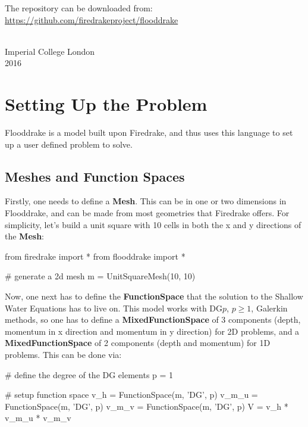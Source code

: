 \documentclass[10pt,letterpaper,extrafontsizes]{memoir}
\newcommand\svnidlong[4]{}
\newcommand\pythonclass[1]{\textbf{\color{deepred}#1}}
\begin{document}
    The repository can be downloaded from: \\
    \url{https://github.com/firedrakeproject/flooddrake}
    
{ \\ Imperial College London \\ 2016\par}


\svnidlong
{$Ignore: $}
{$LastChangedDate: 2015-04-22 17:17:51 +0200 (Wed, 22 Apr 2015) $}
{$LastChangedRevision: 527 $}
{$LastChangedBy: daleif $}

\chapter{Setting Up the Problem}

Flooddrake is a model built upon Firedrake, and thus uses this language to set up a user defined problem to solve. 

\section{Meshes and Function Spaces}

Firstly, one needs to define a \pythonclass{Mesh}. This can be in one or two dimensions in Flooddrake, and can be made from most geometries that Firedrake offers. For simplicity, let's build a unit square with 10 cells in both the x and y directions of the \pythonclass{Mesh}:

\begin{python}
from firedrake import *
from flooddrake import *

# generate a 2d mesh
m = UnitSquareMesh(10, 10)
\end{python}

Now, one next has to define the \pythonclass{FunctionSpace} that the solution to the Shallow Water Equations has to live on. This model works with DG$p$, $p \geq 1$, Galerkin methods, so one has to define a \pythonclass{MixedFunctionSpace} of 3 components (depth, momentum in x direction and momentum in y direction) for 2D problems, and a \pythonclass{MixedFunctionSpace} of 2 components (depth and momentum) for 1D problems. This can be done via:

\begin{python}
# define the degree of the DG elements
p = 1

# setup function space
v_h = FunctionSpace(m, 'DG', p)
v_m_u = FunctionSpace(m, 'DG', p)
v_m_v = FunctionSpace(m, 'DG', p)
V = v_h * v_m_u * v_m_v
\end{python}
\end{document}
